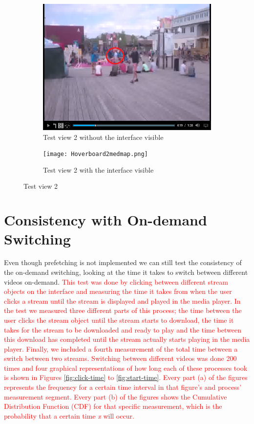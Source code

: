 \begin{figure}
\begin{subfigure}[b]{0.5\textwidth}
 	\includegraphics[width=\linewidth]{Hoverboard_2.png}
  	\caption{Test view 2 without the interface visible}\label{fig:testview2A}
    \end{subfigure}\hfill 
    \hspace{3px}
    \begin{subfigure}[b]{0.5\textwidth}
	 \texttt{[image: Hoverboard2medmap.png]}
 	\caption{Test view 2 with the interface visible}\label{fig:testview2B}
    \end{subfigure}
	\caption{Test view 2}
	\label{fig:testview2}
\end{figure}

\section{Consistency with On-demand Switching}
Even though prefetching is not implemented we can still test the consistency of the on-demand switching, looking at the time it takes to switch between different videos on-demand. \textcolor{red}{This test was done by clicking between different stream objects on the interface and measuring the time it takes from when the user clicks a stream until the stream is displayed and played in the media player. In the test we measured three different parts of this process; the time between the user clicks the stream object until the stream starts to download, the time it takes for the stream to be downloaded and ready to play and the time between this download has completed until the stream actually starts playing in the media player. Finally, we included a fourth measurement of the total time between a switch between two streams. Switching between different videos was done 200 times and four graphical representations of how long each of these processes took is shown in Figures \ref{fig:click-time} to \ref{fig:start-time}. Every part (a) of the figures represents the frequency for a certain time interval in that figure's and process’ measurement segment. Every part (b) of the figures shows the Cumulative Distribution Function (CDF) for that specific measurement, which is the probability that a certain time \textit{x} will occur.}

